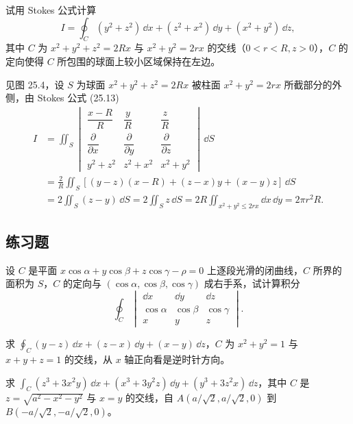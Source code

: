 \begin{xexample}[25.3.5]
试用 Stokes 公式计算
\[
  I=\oint_C(y^2+z^2)\,\dd x+(z^2+x^2)\,\dd y+(x^2+y^2)\,\dd z,
\]
其中 $C$ 为 $x^2+y^2+z^2=2Rx$ 与 $x^2+y^2=2rx$ 的交线（$0<r<R,z>0$），$C$ 的定向使得 $C$ 所包围的球面上较小区域保持在左边。
\end{xexample}

\begin{xsolution}
见图 25.4，设 $S$ 为球面 $x^2+y^2+z^2=2Rx$ 被柱面 $x^2+y^2=2rx$ 所截部分的外侧，由 Stokes 公式 (25.13)
\begin{align*}
I&=\iint_S
\begin{vmatrix}
\dfrac{x-R}{R}&\dfrac yR&\dfrac zR\\
\dfrac\partial{\partial x}&\dfrac\partial{\partial y}&\dfrac\partial{\partial z}\\
y^2+z^2&z^2+x^2&x^2+y^2
\end{vmatrix}\,\dd S\\
&=\frac2R\iint_S[(y-z)(x-R)+(z-x)y+(x-y)z]\,\dd S\\
&=2\iint_S(z-y)\,\dd S
=2\iint_S z\,\dd S
=2R\iint_{x^2+y^2\le2rx}\dd x\,\dd y
=2\pi r^2R.
\end{align*}
\end{xsolution}

\subsection{练习题}

\begin{xexercise}[1]
设 $C$ 是平面 $x\cos\alpha+y\cos\beta+z\cos\gamma-\rho=0$ 上逐段光滑的闭曲线，$C$ 所界的面积为 $S$，$C$ 的定向与 $(\cos\alpha,\cos\beta,\cos\gamma)$ 成右手系，试计算积分
\[
  \oint_C
  \begin{vmatrix}
  \dd x&\dd y&\dd z\\
  \cos\alpha&\cos\beta&\cos\gamma\\
  x&y&z
  \end{vmatrix}.
\]
\end{xexercise}

\begin{xexercise}[2]
求 $\oint_C(y-z)\,\dd x+(z-x)\,\dd y+(x-y)\,\dd z$，$C$ 为 $x^2+y^2=1$ 与 $x+y+z=1$ 的交线，从 $x$ 轴正向看是逆时针方向。
\end{xexercise}

\begin{xexercise}[3]
求 $\int_C(z^3+3x^2y)\,\dd x+(x^3+3y^2z)\,\dd y+(y^3+3z^2x)\,\dd z$，其中 $C$ 是 $z=\sqrt{a^2-x^2-y^2}$ 与 $x=y$ 的交线，自 $A(a/\sqrt2,a/\sqrt2,0)$ 到 $B(-a/\sqrt2,-a/\sqrt2,0)$。
\end{xexercise}

